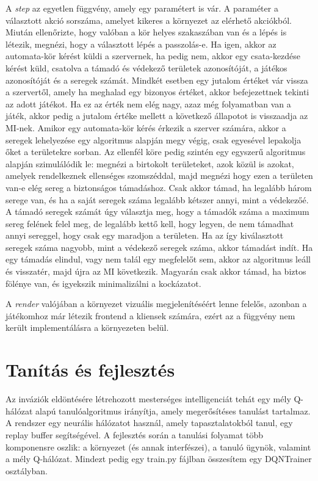 \documentclass[
]{thesis-ekf}
\theoremstyle{definition}
\theoremstyle{remark}
\begin{document}
A \emph{step} az egyetlen függvény, amely egy paramétert is vár. A paraméter a választott akció sorszáma, amelyet kikeres a környezet az elérhető akciókból. Miután ellenőrizte, hogy valóban a kör helyes szakaszában van és a lépés is létezik, megnézi, hogy a választott lépés a passzolás-e. Ha igen, akkor az automata-kör kérést küldi a szervernek, ha pedig nem, akkor egy csata-kezdése kérést küld, csatolva a támadó és védekező területek azonosítóját, a játékos azonosítóját és a seregek számát. Mindkét esetben egy jutalom értéket vár vissza a szervertől, amely ha meghalad egy bizonyos értéket, akkor befejezettnek tekinti az adott játékot. Ha ez az érték nem elég nagy, azaz még folyamatban van a játék, akkor pedig a jutalom értéke mellett a következő állapotot is visszaadja az MI-nek. Amikor egy automata-kör kérés érkezik a szerver számára, akkor a seregek lehelyezése egy algoritmus alapján megy végig, csak egyesével lepakolja őket a területekre sorban. Az ellenfél köre pedig szintén egy egyszerű algoritmus alapján szimulálódik le: megnézi a birtokolt területeket, azok közül is azokat, amelyek rendelkeznek ellenséges szomszéddal, majd megnézi hogy ezen a területen van-e elég sereg a biztonságos támadáshoz. Csak akkor támad, ha legalább három serege van, és ha a saját seregek száma legalább kétszer annyi, mint a védekezőé. A támadó seregek számát úgy választja meg, hogy a támadók száma a maximum sereg felének felel meg, de legalább kettő kell, hogy legyen, de nem támadhat annyi sereggel, hogy csak egy maradjon a területen. Ha az így kiválasztott seregek száma nagyobb, mint a védekező seregek száma, akkor támadást indít. Ha egy támadás elindul, vagy nem talál egy megfelelőt sem, akkor az algoritmus leáll és visszatér, majd újra az MI következik. Magyarán csak akkor támad, ha biztos fölénye van, és igyekszik minimalizálni a kockázatot.

A \emph{render} valójában a környezet vizuális megjelenítéséért lenne felelős, azonban a játékomhoz már létezik frontend a kliensek számára, ezért az a függvény nem került implementálásra a környezeten belül.

\section{Tanítás és fejlesztés}

Az inváziók eldöntésére létrehozott mesterséges intelligenciát tehát egy mély Q-hálózat alapú tanulóalgoritmus irányítja, amely megerősítéses tanulást tartalmaz. A rendszer egy neurális hálózatot használ, amely tapasztalatokból tanul, egy replay buffer segítségével. A fejlesztés során a tanulási folyamat több komponensre oszlik: a környezet (és annak interfészei), a tanuló ügynök, valamint a mély Q-hálózat. Mindezt pedig egy train.py fájlban összesítem egy DQNTrainer osztályban.
\end{document}
